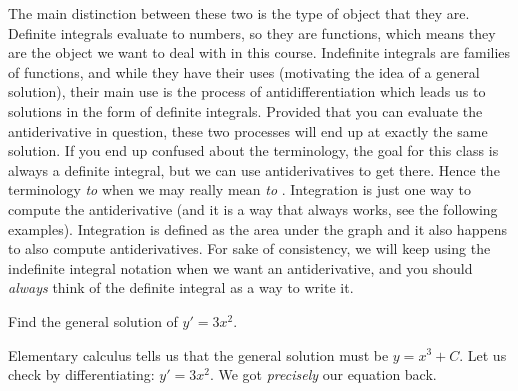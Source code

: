 The main distinction between these two is the type of object that they are. Definite integrals evaluate to numbers, so they are functions, which means they are the object we want to deal with in this course. Indefinite integrals are families of functions, and while they have their uses (motivating the idea of a general solution), their main use is the process of antidifferentiation which leads us to solutions in the form of definite integrals. Provided that you can evaluate the antiderivative in question, these two processes will end up at exactly the same solution. If you end up confused about the terminology, the goal for this class is always a definite integral, but we can use antiderivatives to get there.
Hence the terminology \emph{to } when we may really mean
\emph{to }.
Integration is just one way to compute the
antiderivative (and it is a way that always works, see the following
examples).  Integration is defined as the area under the graph and it
also happens to also compute antiderivatives.
For sake of consistency, we will keep using the
indefinite integral notation when we want an antiderivative,
and you should \emph{always} think of the definite integral
as a way to write it.

\begin{example}
Find the general solution of $y' = 3 x^2$.
\end{example}

\begin{exampleSol}
Elementary calculus tells us
that the general solution must be $y = x^3 + C$.  Let us check by
differentiating:
$y' = 3x^2$.  We got \emph{precisely} our equation back.
\end{exampleSol}

